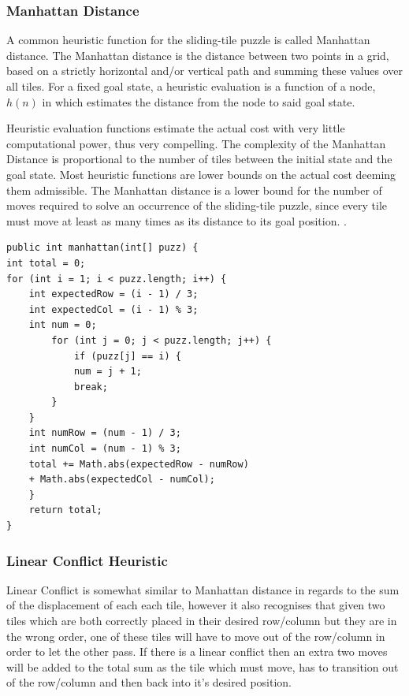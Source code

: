 \documentclass[final]{cmpreport}
\begin{document}
\subsubsection{Manhattan Distance}
A common heuristic function for the sliding-tile puzzle is called Manhattan distance. The Manhattan distance is the distance between two points in a grid, based on a strictly horizontal and/or vertical path and summing these values over all tiles. For a fixed goal state, a heuristic evaluation is a function of a node, $h(n)$ in which estimates the distance from the node to said goal state.


Heuristic evaluation functions estimate the actual cost with very little computational power, thus very compelling. The complexity of the Manhattan Distance is proportional to the number of tiles between the initial state and the goal state. Most heuristic functions are lower bounds on the actual cost deeming them admissible. The Manhattan distance is a lower bound for the number of moves required to solve an occurrence of the sliding-tile puzzle, since every tile must move at least as many times as its distance to its goal position. \citep{DBLP:conf/ccgrid/LinnertSB14}.

\begin{verbatim}
public int manhattan(int[] puzz) {
int total = 0;
for (int i = 1; i < puzz.length; i++) {
    int expectedRow = (i - 1) / 3;
    int expectedCol = (i - 1) % 3;
    int num = 0;
        for (int j = 0; j < puzz.length; j++) {
            if (puzz[j] == i) {
            num = j + 1;
            break;
        }    
    }
    int numRow = (num - 1) / 3;
    int numCol = (num - 1) % 3;
    total += Math.abs(expectedRow - numRow)
    + Math.abs(expectedCol - numCol);
    }
    return total;
}
\end{verbatim}
\subsubsection{Linear Conflict Heuristic}
Linear Conflict is somewhat similar to Manhattan distance in regards to the sum of the displacement of each each tile, however it also recognises that given two tiles which are both correctly placed in their desired row/column but they are in the wrong order, one of these tiles will have to move out of the row/column in order to let the other pass. If there is a linear conflict then an extra two moves will be added to the total sum as the tile which must move, has to transition out of the row/column and then back into it's desired position.
\end{document}
